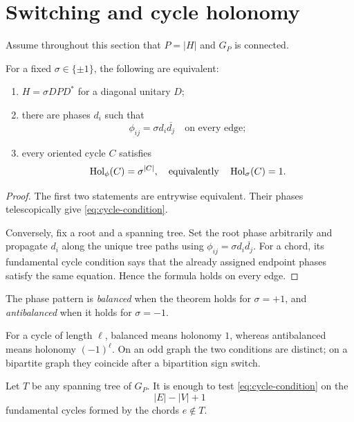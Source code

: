 \section{Switching and cycle holonomy}
\label{sec:holonomy}

Assume throughout this section that \(P=|H|\) and \(G_P\) is connected.

\begin{theorem}\label{thm:holonomy}
For a fixed \(\sigma\in\{\pm1\}\), the following are equivalent:
\begin{enumerate}[label=(\roman*),leftmargin=2.4em]
\item \(H=\sigma DPD^*\) for a diagonal unitary \(D\);
\item there are phases \(d_i\) such that
\[
 \phi_{ij}=\sigma d_i\overline{d_j}
 \quad\text{on every edge};
\]
\item every oriented cycle \(C\) satisfies
\begin{equation}\label{eq:cycle-condition}
 \operatorname{Hol}_\phi(C)=\sigma^{|C|},
 \quad\text{equivalently}\quad
 \operatorname{Hol}_\sigma(C)=1.
\end{equation}
\end{enumerate}
\end{theorem}

\begin{proof}
The first two statements are entrywise equivalent.  Their phases
telescopically give \eqref{eq:cycle-condition}.

Conversely, fix a root and a spanning tree.  Set the root phase
arbitrarily and propagate \(d_i\) along the unique tree paths using
\(\phi_{ij}=\sigma d_i\overline{d_j}\).  For a chord, its fundamental
cycle condition says that the already assigned endpoint phases satisfy
the same equation.  Hence the formula holds on every edge.
\end{proof}

\begin{definition}
The phase pattern is \emph{balanced} when the theorem holds for
\(\sigma=+1\), and \emph{antibalanced} when it holds for
\(\sigma=-1\).
\end{definition}

For a cycle of length \(\ell\), balanced means holonomy \(1\), whereas
antibalanced means holonomy \((-1)^\ell\).  On an odd graph the two
conditions are distinct; on a bipartite graph they coincide after a
bipartition sign switch.

\begin{corollary}\label{cor:fundamental}
Let \(T\) be any spanning tree of \(G_P\).  It is enough to test
\eqref{eq:cycle-condition} on the
\[
 |E|-|V|+1
\]
fundamental cycles formed by the chords \(e\notin T\).
\end{corollary}

